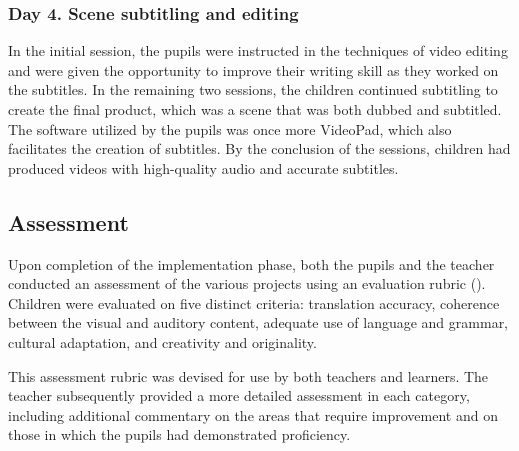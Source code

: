 \subsubsection{Day 4. Scene subtitling and editing}

In the initial session, the pupils were instructed in the techniques of
video editing and were given the opportunity to improve their writing
skill as they worked on the subtitles. In the remaining two sessions,
the children continued subtitling to create the final product, which was
a scene that was both dubbed and subtitled. The software utilized by the
pupils was once more VideoPad, which also facilitates the creation of
subtitles. By the conclusion of the sessions, children had produced
videos with high-quality audio and accurate subtitles.

\subsection{Assessment}\label{sub-sec-assesment}

Upon completion of the implementation phase, both the pupils and the
teacher conducted an assessment of the various projects using an
evaluation rubric (). Children were evaluated on five distinct
criteria: translation accuracy, coherence between the visual and
auditory content, adequate use of language and grammar, cultural
adaptation, and creativity and originality.

This assessment rubric was devised for use by both teachers and
learners. The teacher subsequently provided a more detailed assessment
in each category, including additional commentary on the areas that
require improvement and on those in which the pupils had demonstrated
proficiency.
